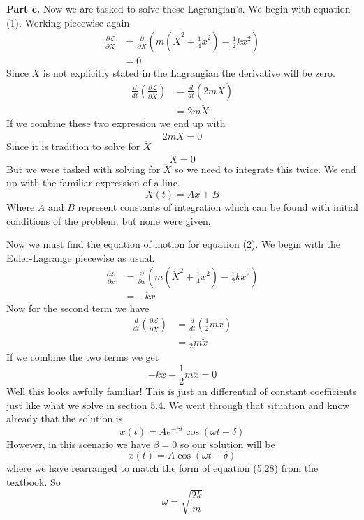 \documentclass[11pt, leqno]{article}
\begin{document}
\noindent \textbf{Part c.}
Now we are tasked to solve these Lagrangian's. We begin with equation (1). Working piecewise again
\begin{align*}
\frac{\partial \mathcal{L}}{\partial X} &=  \frac{\partial}{\partial X}\left( m\left(\dot{X}^2 + \frac{1}{4}\dot{x}^2\right) - \frac{1}{2}kx^2 \right) \\
&= 0
\end{align*}
Since $X$ is not explicitly stated in the Lagrangian the derivative will be zero. 
\begin{align*}
\frac{d}{dt}\left(\frac{\partial \mathcal{L}}{\partial \dot{X}}\right) &= \frac{d}{dt}\left( 2m\dot{X} \right) \\
&= 2m\ddot{X}
\end{align*}
If we combine these two expression we end up with 
$$
2m\ddot{X} = 0
$$
Since it is tradition to solve for $\ddot{X}$ 
$$
\ddot{X} = 0
$$
But we were tasked with solving for $\ddot{X}$ so we need to integrate this twice. We end up with the familiar expression of a line. 
$$
\boxed{X(t) = Ax + B} 
$$ 
Where $A$ and $B$ represent constants of integration which can be found with initial conditions of the problem, but none were given. 

\bigskip 

\noindent Now we must find the equation of motion for equation (2). We begin with the Euler-Lagrange piecewise as usual. 
\begin{align*}
\frac{\partial \mathcal{L}}{\partial x} &=  \frac{\partial}{\partial x}\left( m\left(\dot{X}^2 + \frac{1}{4}\dot{x}^2\right) - \frac{1}{2}kx^2 \right) \\
&= -kx
\end{align*}
Now for the second term we have 
\begin{align*}
\frac{d}{dt}\left(\frac{\partial \mathcal{L}}{\partial \dot{X}}\right) &= \frac{d}{dt}\left( \frac{1}{2}m\dot{x} \right) \\
&= \frac{1}{2}m\ddot{x}
\end{align*}
If we combine the two terms we get 
$$
-kx - \frac{1}{2}m\ddot{x} = 0
$$
Well this looks awfully familiar! This is just an differential of constant coefficients just like what we solve in section 5.4. We went through that situation and know already that the solution is 
$$ 
x(t) = A e^{-\beta t} \cos(\omega t - \delta)
$$
However, in this scenario we have $\beta = 0$ so our solution will be 
$$
\boxed{x(t) = A \cos(\omega t - \delta)}
$$ 
where we have rearranged to match the form of equation (5.28) from the textbook. So 
$$ 
\omega = \sqrt{\frac{2 k }{m}}
$$
\end{document}
